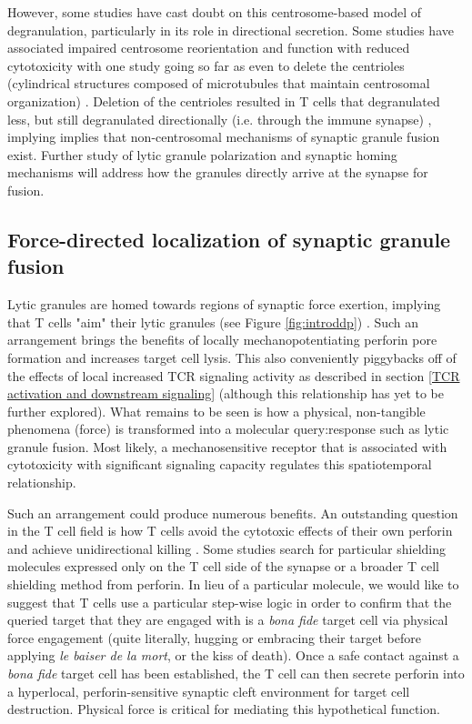 However, some studies have cast doubt on this centrosome-based model of degranulation, particularly in its role in directional secretion. Some studies have associated impaired centrosome reorientation and function with reduced cytotoxicity \cite{Quann2009, Tsun2011, DeLaRoche2013, Jenkins2014} with one study going so far as even to delete the centrioles (cylindrical structures composed of microtubules that maintain centrosomal organization) \cite{Tamzalit2020}. Deletion of the centrioles resulted in T cells that degranulated less, but still degranulated directionally (i.e. through the immune synapse) \cite{Tamzalit2020}, implying implies that non-centrosomal mechanisms of synaptic granule fusion exist. Further study of lytic granule polarization and synaptic homing mechanisms will address how the granules directly arrive at the synapse for fusion.

\subsection{Force-directed localization of synaptic granule fusion}
\label{Force-directed localization of synaptic granule fusion}
Lytic granules are homed towards regions of synaptic force exertion, implying that T cells "aim" their lytic granules (see Figure \ref{fig:introddp}) \cite{Basu2016}. Such an arrangement brings the benefits of locally mechanopotentiating perforin pore formation and increases target cell lysis. This also conveniently piggybacks off of the effects of local increased TCR signaling activity as described in section \ref{TCR activation and downstream signaling} (although this relationship has yet to be further explored). What remains to be seen is how a physical, non-tangible phenomena (force) is transformed into a molecular query:response such as lytic granule fusion. Most likely, a mechanosensitive receptor that is associated with cytotoxicity with significant signaling capacity regulates this spatiotemporal relationship. 

Such an arrangement could produce numerous benefits. An outstanding question in the T cell field is how T cells avoid the cytotoxic effects of their own perforin and achieve unidirectional killing \cite{Lopez2013}. Some studies search for particular shielding molecules expressed only on the T cell side of the synapse \cite{Balaji2002} or a broader T cell shielding method \cite{Rudd-schmidt} from perforin. In lieu of a particular molecule, we would like to suggest that T cells use a particular step-wise logic in order to confirm that the queried target that they are engaged with is a \textit{bona fide} target cell via physical force engagement (quite literally, hugging or embracing their target before applying \textit{le baiser de la mort}, or the kiss of death). Once a safe contact against a \textit{bona fide} target cell has been established, the T cell can then secrete perforin into a hyperlocal, perforin-sensitive synaptic cleft environment for target cell destruction. Physical force is critical for mediating this hypothetical function. 

